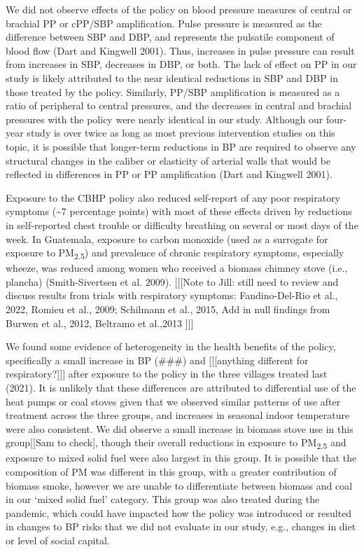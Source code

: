 \documentclass[
  letterpaper,
  DIV=11,
  numbers=noendperiod]{scrartcl}
\begin{document}
We did not observe effects of the policy on blood pressure measures of
central or brachial PP or cPP/SBP amplification. Pulse pressure is
measured as the difference between SBP and DBP, and represents the
pulsatile component of blood flow (Dart and Kingwell 2001). Thus,
increases in pulse pressure can result from increases in SBP, decreases
in DBP, or both. The lack of effect on PP in our study is likely
attributed to the near identical reductions in SBP and DBP in those
treated by the policy. Similarly, PP/SBP amplification is measured as a
ratio of peripheral to central pressures, and the decreases in central
and brachial pressures with the policy were nearly identical in our
study. Although our four-year study is over twice as long as most
previous intervention studies on this topic, it is possible that
longer-term reductions in BP are required to observe any structural
changes in the caliber or elasticity of arterial walls that would be
reflected in differences in PP or PP amplification (Dart and Kingwell
2001).

Exposure to the CBHP policy also reduced self-report of any poor
respiratory symptoms (\textasciitilde7 percentage points) with most of
these effects driven by reductions in self-reported chest trouble or
difficulty breathing on several or most days of the week. In Guatemala,
exposure to carbon monoxide (used as a surrogate for exposure to
PM\textsubscript{2.5}) and prevalence of chronic respiratory symptoms,
especially wheeze, was reduced among women who received a biomass
chimney stove (i.e., plancha) (Smith-Sivertsen et al. 2009).
{[}{[}{[}Note to Jill: still need to review and discuss results from
trials with respiratory symptoms: Fandino-Del-Rio et al., 2022, Romieu
et al., 2009; Schilmann et al., 2015, Add in null findings from Burwen
et al., 2012, Beltramo et al.,2013 {]}{]}{]}

We found some evidence of heterogeneity in the health benefits of the
policy, specifically a small increase in BP (\#\#\#) and
{[}{[}{[}anything different for respiratory?{]}{]}{]} after exposure to
the policy in the three villages treated last (2021). It is unlikely
that these differences are attributed to differential use of the heat
pumps or coal stoves given that we observed similar patterns of use
after treatment across the three groups, and increases in seasonal
indoor temperature were also consistent. We did observe a small increase
in biomass stove use in this group{[}{[}Sam to check{]}, though their
overall reductions in exposure to PM\textsubscript{2.5} and exposure to
mixed solid fuel were also largest in this group. It is possible that
the composition of PM was different in this group, with a greater
contribution of biomass smoke, however we are unable to differentiate
between biomass and coal in our `mixed solid fuel' category. This group
was also treated during the pandemic, which could have impacted how the
policy was introduced or resulted in changes to BP risks that we did not
evaluate in our study, e.g., changes in diet or level of social capital.
\end{document}
